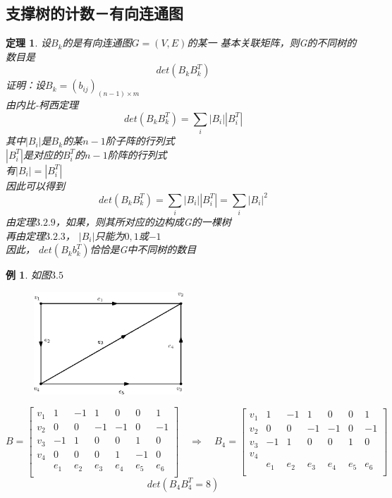 \documentclass[11pt,a4paper,openany]{book}
\newcommand{\song}{\CJKfamily{song}}
\newtheorem{theorem}{\textbf{定理}}[section]
\newtheorem{sample}{\textbf{例}}[section]
\begin{document}
\subsection{支撑树的计数－有向连通图}
\begin{theorem}
设$B_k$的是有向连通图$G=(V,E)$的某一
基本关联矩阵，则G的不同树的数目是$$det(B_kB^T_k)$$
{\song
证明：设$B_k=(b_{ij})_{(n-1)\times m}$\\
由内比-柯西定理$$det(B_k B_k^T)=\sum_{i}|B_i||B_i^T|$$
其中$|B_i|$是$B_k$的某$n-1$阶子阵的行列式\\
$|B_i^T|$是对应的$B_i^T$的$n-1$阶阵的行列式\\
有$|B_i|=|B_i^T|$\\
因此可以得到$$det(B_k B_k^T)=\sum_{i}|B_i||B_i^T|=\sum_i|B_i|^{2}$$
由定理$3.2.9$，如果，则其所对应的边构成G的一棵树\\
再由定理$3.2.3$， $|B_i|$只能为$0,1$或$-1$\\
因此， $det(B_k b_k^T)$恰恰是G中不同树的数目\\
}
\end{theorem}
\begin{sample}
如图$3.5$
\begin{figure}[H]
  \centering
  \includegraphics[width=0.5\textwidth]{3_5_1.eps}\\
  \caption{}
\end{figure}
$
B=\left[
    \begin{array}{ccccccc}
      v_1 & 1 & -1 & 1 & 0 & 0 & 1 \\
      v_2 & 0 & 0 & -1 & -1 &0 & -1 \\
      v_3 & -1 & 1 & 0 & 0 & 1 & 0 \\
      v_4 & 0 & 0 & 0 & 1 & -1 & 0 \\
      & e_1 & e_2 & e_3 & e_4 & e_5 & e_6 \\
    \end{array}
  \right]\quad \Rightarrow \quad
  B_4=\left[
    \begin{array}{ccccccc}
      v_1 & 1 & -1 & 1 & 0 & 0 & 1 \\
      v_2 & 0 & 0 & -1 & -1 &0 & -1 \\
      v_3 & -1 & 1 & 0 & 0 & 1 & 0 \\
      v_4 &  &  &  &  &  & \\
      & e_1 & e_2 & e_3 & e_4 & e_5 & e_6 \\
    \end{array}
  \right]
$ $$det(B_4 B_4^T=8)$$
\end{sample}
\end{document}
